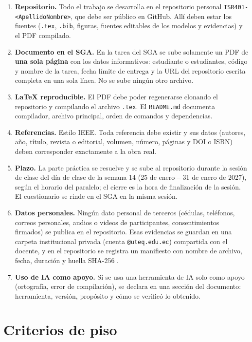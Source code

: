 \documentclass[11pt]{article}
\newcommand{\seccion}[1]{\section{\textcolor{utegreendk}{#1}}}
\begin{document}
\begin{enumerate}[leftmargin=20pt,itemsep=3pt]
	\item \textbf{Repositorio.} Todo el trabajo se desarrolla en el repositorio personal \texttt{ISR401-<ApellidoNombre>}, que debe ser público en GitHub. Allí deben estar los fuentes (\texttt{.tex}, \texttt{.bib}, figuras, fuentes editables de los modelos y evidencias) y el PDF compilado.
	\item \textbf{Documento en el SGA.} En la tarea del SGA se sube solamente un PDF de \textbf{una sola página} con los datos informativos: estudiante o estudiantes, código y nombre de la tarea, fecha límite de entrega y la URL del repositorio escrita completa en una sola línea. No se sube ningún otro archivo.
	\item \textbf{\LaTeX{} reproducible.} El PDF debe poder regenerarse clonando el repositorio y compilando el archivo \texttt{.tex}. El \texttt{README.md} documenta compilador, archivo principal, orden de comandos y dependencias.
	\item \textbf{Referencias.} Estilo IEEE. Toda referencia debe existir y sus datos (autores, año, título, revista o editorial, volumen, número, páginas y DOI o ISBN) deben corresponder exactamente a la obra real.
	\item \textbf{Plazo.} La parte práctica se resuelve y se sube al repositorio durante la sesión de clase del día de clase de la semana 14 (25 de enero -- 31 de enero de 2027), según el horario del paralelo; el cierre es la hora de finalización de la sesión. El cuestionario se rinde en el SGA en la misma sesión.
	\item \textbf{Datos personales.} Ningún dato personal de terceros (cédulas, teléfonos, correos personales, audios o videos de participantes, consentimientos firmados) se publica en el repositorio. Esas evidencias se guardan en una carpeta institucional privada (cuenta \texttt{@uteq.edu.ec}) compartida con el docente, y en el repositorio se registra un manifiesto con nombre de archivo, fecha, duración y huella SHA-256 \citep{lopdp_2021}.
	\item \textbf{Uso de IA como apoyo.} Si se usa una herramienta de IA solo como apoyo (ortografía, error de compilación), se declara en una sección del documento: herramienta, versión, propósito y cómo se verificó lo obtenido.
\end{enumerate}

\seccion{Criterios de piso}
\end{document}

